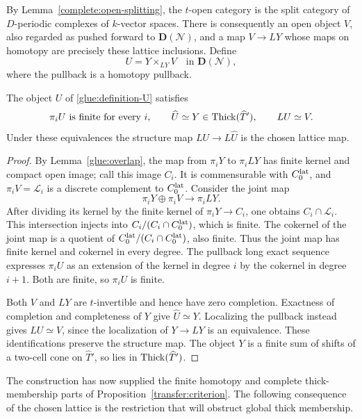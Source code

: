 By Lemma~\ref{complete:open-splitting}, the $t$-open category is
the split category of $D$-periodic complexes of $k$-vector spaces.
There is consequently an open object $V$, also regarded as pushed
forward to $\mathbf D(\mathcal N)$, and a map $V\to LY$ whose maps
on homotopy are precisely these lattice inclusions. Define
\begin{equation}
 U=Y\mathop{\times}_{LY}V\quad\text{in }\mathbf D(\mathcal N),
 \label{glue:definition-U}
\end{equation}
where the pullback is a homotopy pullback.

\begin{proposition}
\label{glue:object}
The object $U$ of \eqref{glue:definition-U} satisfies
\[
 \pi_iU\text{ is finite for every }i,\qquad
 \widehat U\simeq Y\in\operatorname{Thick}(\widehat T'),\qquad LU\simeq V.
\]
Under these equivalences the structure map
$LU\longrightarrow L\widehat U$ is the chosen lattice map.
\end{proposition}

\begin{proof}
By Lemma~\ref{glue:overlap}, the map from $\pi_iY$ to $\pi_iLY$
has finite kernel and compact open image; call this image $C_i$.
It is commensurable with $C_0^{\rm lat}$, and
$\pi_iV=\mathcal L_i$ is a discrete complement to
$C_0^{\rm lat}$. Consider the joint map
\[
 \pi_iY\oplus\pi_iV\longrightarrow\pi_iLY.
\]
After dividing its kernel by the finite kernel of $\pi_iY\to C_i$,
one obtains $C_i\cap\mathcal L_i$. This intersection injects into
$C_i/(C_i\cap C_0^{\rm lat})$, which is finite. The cokernel of the
joint map is a quotient of
$C_0^{\rm lat}/(C_i\cap C_0^{\rm lat})$, also finite.
Thus the joint map has finite kernel and cokernel in every degree.
The pullback long exact sequence expresses $\pi_iU$ as an extension
of the kernel in degree $i$ by the cokernel in degree $i+1$.
Both are finite, so $\pi_iU$ is finite.

Both $V$ and $LY$ are $t$-invertible and hence have zero completion.
Exactness of completion and completeness of $Y$ give
$\widehat U\simeq Y$. Localizing the pullback instead gives
$LU\simeq V$, since the localization of $Y\to LY$ is an equivalence.
These identifications preserve the structure map. The object $Y$ is
a finite sum of shifts of a two-cell cone on $\widehat T'$, so lies
in $\operatorname{Thick}(\widehat T')$.
\end{proof}

The construction has now supplied the finite homotopy and complete
thick-membership parts of Proposition~\ref{transfer:criterion}.
The following consequence of the chosen lattice is the restriction
that will obstruct global thick membership.

